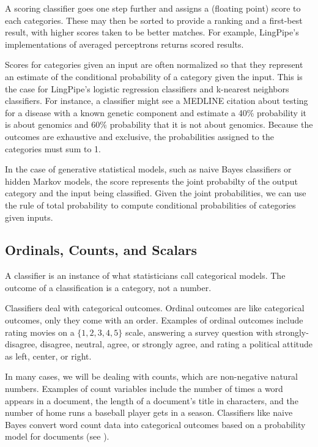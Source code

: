 A scoring classifier goes one step further and assigns a (floating
point) score to each categories.  These may then be sorted to provide
a ranking and a first-best result, with higher scores taken to be
better matches.  For example, LingPipe's implementations of averaged
perceptrons returns scored results.

Scores for categories given an input are often normalized so that they
represent an estimate of the conditional probability of a category
given the input.  This is the case for LingPipe's logistic regression
classifiers and k-nearest neighbors classifiers.  For instance, a
classifier might see a MEDLINE citation about testing for a disease
with a known genetic component and estimate a 40\% probability it is
about genomics and 60\% probability that it is not about genomics.
Because the outcomes are exhaustive and exclusive, the probabilities
assigned to the categories must sum to 1.

In the case of generative statistical models, such as naive Bayes
classifiers or hidden Markov models, the score represents the joint
probabilty of the output category and the input being classified.
Given the joint probabilities, we can use the rule of total
probability to compute conditional probabilities of categories given
inputs.

\subsection{Ordinals, Counts, and Scalars}

A classifier is an instance of what statisticians call categorical
models.  The outcome of a classification is a category, not a number.

Classifiers deal with categorical outcomes.  Ordinal outcomes are like
categorical outcomes, only they come with an order.  Examples of
ordinal outcomes include rating movies on a $\{ 1, 2, 3, 4, 5 \}$
scale, answering a survey question with strongly-disagree, disagree,
neutral, agree, or strongly agree, and rating a political attitude as
left, center, or right.

In many cases, we will be dealing with counts, which are non-negative
natural numbers.  Examples of count variables include the number of
times a word appears in a document, the length of a document's title
in characters, and the number of home runs a baseball player gets in a
season.  Classifiers like naive Bayes convert word count data into
categorical outcomes based on a probability model for documents (see
).

